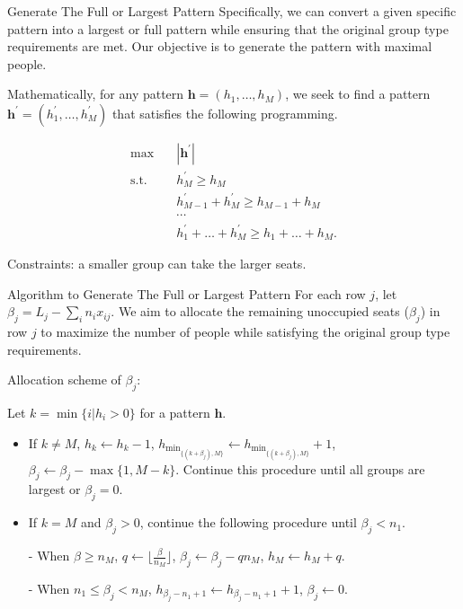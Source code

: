   \begin{frame}{Generate The Full or Largest Pattern}
    Specifically, we can convert a given specific pattern into a largest or full pattern while ensuring that the original group type requirements are met. Our objective is to generate the pattern with maximal people.

    Mathematically, for any pattern $\bm{h} = (h_1, \ldots, h_M)$, we seek to find a pattern $\bm{h}^{'} = (h_1^{'}, \ldots, h_M^{'})$ that satisfies the following programming.

    \begin{equation*}\label{full_largest}
      \begin{aligned}
      \max \quad & |\bm{h}^{'}| \\
      \text {s.t.} \quad & h_M^{'} \geq h_M \\
      &  h_{M-1}^{'} + h_M^{'} \geq h_{M-1} + h_M \\
      & \cdots \\
      & h_1^{'} + \ldots + h_M^{'} \geq h_1 + \ldots + h_M.
      \end{aligned}
    \end{equation*}

    Constraints: a smaller group can take the larger seats.
  \end{frame}

  \begin{frame}{Algorithm to Generate The Full or Largest Pattern}
    For each row $j$, let $\beta_{j} = L_{j} - \sum_{i} n_{i} x_{ij}$. We aim to allocate the remaining unoccupied seats ($\beta_{j}$) in row $j$ to maximize the number of people while satisfying the original group type requirements.
    \vspace{0.5cm}
    
    Allocation scheme of $\beta_{j}$:
    \vspace{0.5cm}

    \begin{scriptsize}
      Let $k = \min\{i | h_i > 0\}$ for a pattern $\bm{h}$.

      \begin{itemize}
        \item If $k \neq M$, $h_{k} \gets h_{k} -1$, $h_{\min_{\{(k+\beta_{j}), M\}}} \gets h_{\min_{\{(k+\beta_{j}), M\}}} +1$, $\beta_{j} \gets \beta_{j} - \max\{1, M - k\}$. Continue this procedure until all groups are largest or $\beta_{j} =0$. 
        \item If $k = M$ and $\beta_{j} > 0$, continue the following procedure until $\beta_{j} < n_{1}$.
        \item[-] When $\beta \geq n_{M}$, $q \gets \lfloor\frac{\beta}{n_M}\rfloor$, $\beta_{j} \gets \beta_{j} - q n_M$, $h_{M} \gets h_{M} + q$.
        \item[-] When $n_{1} \leq \beta_{j} < n_{M}$, $h_{\beta_{j}-n_1+1} \gets h_{\beta_{j}-n_1+1} + 1$, $\beta_{j} \gets 0$.
      \end{itemize}  
    \end{scriptsize}
    
  \end{frame}